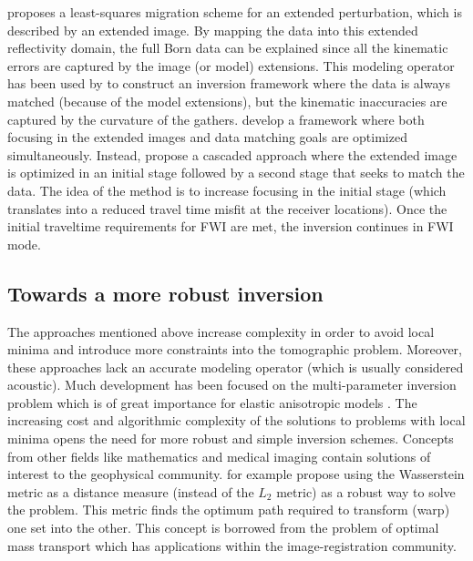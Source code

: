 \cite{GPR:GPR698} proposes a least-squares migration scheme for an extended perturbation, which
 is described by an extended image. By mapping the data into this extended reflectivity domain, 
 the full Born data can be explained since all the kinematic errors are captured by the image (or model)
extensions. This modeling operator has been used by \cite{BiondiAli:2014} to construct
an inversion framework where the data is always matched (because of the model extensions), 
 but the kinematic inaccuracies are captured by the curvature of the gathers. 
 \cite{FleuryPerrone} develop a framework where both focusing in the  extended images and data matching 
goals are optimized simultaneously. Instead, \cite{diaz2013data} propose a cascaded 
approach where the extended image is optimized in an initial stage followed by a second stage 
that seeks to match the data. The idea of the method is to increase focusing in the initial stage
 (which translates into a reduced travel time misfit at the receiver locations). Once the
initial traveltime requirements for FWI are met, the inversion continues in FWI mode. 

\subsection{Towards a more robust inversion}

The approaches mentioned above increase complexity in order to avoid local minima
 and introduce more constraints into the tomographic problem.  
 Moreover, these approaches lack an accurate modeling operator
(which is usually considered acoustic). Much development has been focused on the multi-parameter inversion
problem which is of great importance for elastic anisotropic models \citep{barnes2008feasibility,guasch,Kamath,espen,yuting}. 
The increasing cost  and algorithmic complexity of the solutions to problems with local minima opens
the need for more robust and simple inversion schemes. Concepts from 
other fields like mathematics and medical imaging contain solutions of interest 
to the geophysical community. \cite{engquist2013application} for example propose using the 
Wasserstein metric as a distance measure (instead of the $L_2$ metric) as a robust 
way to solve the problem. This metric finds the optimum path required to
 transform (warp) one set into the other. This concept is borrowed from the problem of optimal mass transport
which has applications within the image-registration community. 

